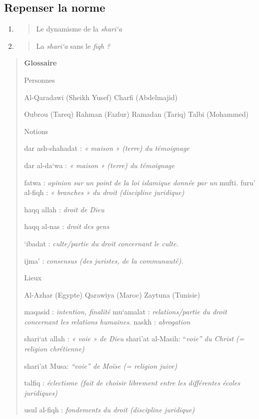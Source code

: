 \begin{enumerate}
{  \subsection{\texorpdfstring{{Repenser la
  norme}}{Repenser la norme}}\label{repenser-la-norme}}

  \begin{enumerate}
  \def\labelenumii{\arabic{enumii}.}
  \item
    \begin{quote}
    Le dynamisme de la \emph{shari`a}
    \end{quote}
  \item
    \begin{quote}
    La \emph{shari`a} sans le \emph{fiqh ?}
    \end{quote}
  \end{enumerate}
\end{enumerate}

\begin{quote}
\textbf{{Glossaire}}

{Personnes}

Al-Qaradawi (Sheikh Yusef) Charfi (Abdelmajid)

Oubrou (Tareq) Rahman (Fazlur) Ramadan (Tariq) Talbi (Mohammed)

{Notions}

dar ash-shahadat : \emph{« maison » (terre) du témoignage}

dar al-da`wa : \emph{« maison » (terre) du témoignage}

fatwa : \emph{opinion sur un point de la loi islamique donnée par un}
mufti\emph{.} furu' al-fiqh : \emph{« branches » du droit (discipline
juridique)}

haqq allah : \emph{droit de Dieu}

haqq al-nas : \emph{droit des gens}

`ibadat : \emph{culte/partie du droit concernant le culte.}

ijma' : \emph{consensus (des juristes, de la communauté).}

{Lieux}

Al-Azhar (Egypte) Qarawiya (Maroc) Zaytuna (Tunisie)

maqasid : \emph{intention, finalité} mu`amalat : \emph{relations/partie
du droit concernant les relations humaines.} naskh : \emph{abrogation}

shari`at allah : \emph{« voie » de Dieu} shari'at al-Masih:
``\emph{voie'' du Christ (= religion chrétienne)}

shari'at Musa: \emph{``voie'' de Moïse (= religion juive)}

talfiq : \emph{éclectisme (fait de choisir librement entre les
différentes écoles juridiques)}

usul al-fiqh : \emph{fondements du droit (discipline juridique)}
\end{quote}

